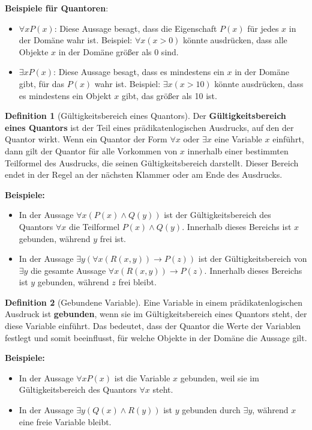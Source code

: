 \documentclass{book}
\theoremstyle{plain}
\theoremstyle{remark}
\theoremstyle{definition}
\newtheorem{definition}{Definition}[section]
\begin{document}
\textbf{Beispiele für Quantoren}:
\begin{itemize}
    \item \(\forall x P(x)\): Diese Aussage besagt, dass die Eigenschaft \(P(x)\) für jedes \(x\) in der Domäne wahr ist. Beispiel: \(\forall x (x > 0)\) könnte ausdrücken, dass alle Objekte \(x\) in der Domäne größer als 0 sind.
    \item \(\exists x P(x)\): Diese Aussage besagt, dass es mindestens ein \(x\) in der Domäne gibt, für das \(P(x)\) wahr ist. Beispiel: \(\exists x (x > 10)\) könnte ausdrücken, dass es mindestens ein Objekt \(x\) gibt, das größer als 10 ist.
\end{itemize}

\begin{definition}[Gültigkeitsbereich eines Quantors]
Der \textbf{Gültigkeitsbereich eines Quantors} ist der Teil eines prädikatenlogischen Ausdrucks, auf den der Quantor wirkt. Wenn ein Quantor der Form \(\forall x\) oder \(\exists x\) eine Variable \(x\) einführt, dann gilt der Quantor für alle Vorkommen von \(x\) innerhalb einer bestimmten Teilformel des Ausdrucks, die seinen Gültigkeitsbereich darstellt. Dieser Bereich endet in der Regel an der nächsten Klammer oder am Ende des Ausdrucks.

\textbf{Beispiele:}
\begin{itemize}
    \item In der Aussage \(\forall x (P(x) \land Q(y))\) ist der Gültigkeitsbereich des Quantors \(\forall x\) die Teilformel \(P(x) \land Q(y)\). Innerhalb dieses Bereichs ist \(x\) gebunden, während \(y\) frei ist.
    \item In der Aussage \(\exists y (\forall x (R(x, y)) \rightarrow P(z))\) ist der Gültigkeitsbereich von \(\exists y\) die gesamte Aussage \(\forall x (R(x, y)) \rightarrow P(z)\). Innerhalb dieses Bereichs ist \(y\) gebunden, während \(z\) frei bleibt.
\end{itemize}
\end{definition}

\begin{definition}[Gebundene Variable]
Eine Variable in einem prädikatenlogischen Ausdruck ist \textbf{gebunden}, wenn sie im Gültigkeitsbereich eines Quantors steht, der diese Variable einführt. Das bedeutet, dass der Quantor die Werte der Variablen festlegt und somit beeinflusst, für welche Objekte in der Domäne die Aussage gilt.

\textbf{Beispiele:}
\begin{itemize}
    \item In der Aussage \(\forall x P(x)\) ist die Variable \(x\) gebunden, weil sie im Gültigkeitsbereich des Quantors \(\forall x\) steht.
    \item In der Aussage \(\exists y (Q(x) \land R(y))\) ist \(y\) gebunden durch \(\exists y\), während \(x\) eine freie Variable bleibt.
\end{itemize}
\end{definition}
\end{document}
